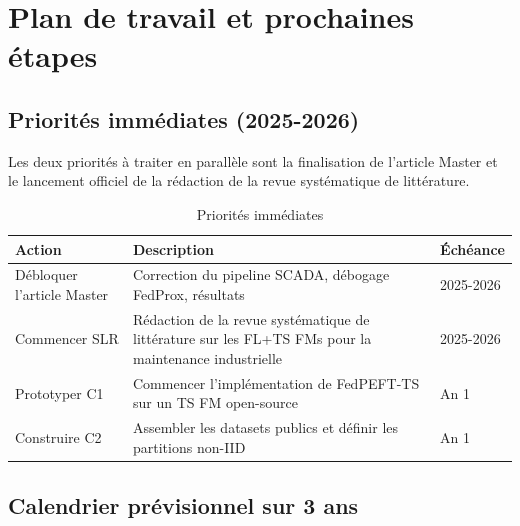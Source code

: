 \documentclass[12pt, a4paper]{report}
\begin{document}
\chapter{Plan de travail et prochaines étapes}

\section{Priorités immédiates (2025-2026)}

Les deux priorités à traiter en parallèle sont la finalisation de l'article Master et
le lancement officiel de la rédaction de la revue systématique de littérature.

\begin{table}[h!]
\centering
\caption{Priorités immédiates}
\label{tab:priorities}
\renewcommand{\arraystretch}{1.5}
\begin{tabularx}{\textwidth}{lXC}
\toprule
Action & Description & Échéance \\
\midrule
Débloquer l'article Master & Correction du pipeline SCADA, débogage FedProx, résultats & 2025-2026 \\
Commencer SLR & Rédaction de la revue systématique de littérature sur les FL+TS FMs pour la maintenance industrielle & 2025-2026 \\
Prototyper C1 & Commencer l'implémentation de FedPEFT-TS sur un TS FM open-source & An 1 \\
Construire C2 & Assembler les datasets publics et définir les partitions non-IID & An 1 \\
\bottomrule
\end{tabularx}
\end{table}

\section{Calendrier prévisionnel sur 3 ans}
\end{document}
